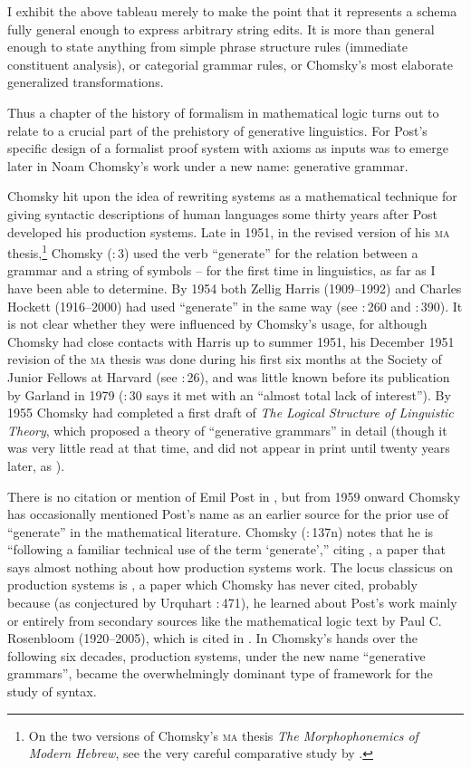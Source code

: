 \documentclass[output=paper]{langscibook}
\begin{document}
I exhibit the above tableau merely to make the point that it represents a schema fully general enough to express arbitrary string edits. It is more than general enough to state anything from simple phrase structure rules (immediate constituent analysis), or categorial grammar rules, or Chomsky's most elaborate generalized transformations.

Thus a chapter of the history of formalism in mathematical logic turns out to relate to a crucial part of the prehistory of generative linguistics. For Post's specific design of a formalist proof system with axioms as inputs was to emerge later in Noam Chomsky's work under a new name: generative grammar.

Chomsky hit upon the idea of rewriting systems as a mathematical technique for giving syntactic descriptions of human languages some thirty years after Post developed his production systems.  Late in 1951, in the revised version of his \textsc{ma} thesis,\footnote{On the two versions of Chomsky's \textsc{ma} thesis \textit{The Morphophonemics of Modern Hebrew}, see the very careful comparative study by \citet{Daniels10}.} Chomsky (\citeyear{Chomsky51b}:\,3) used the verb ``generate'' for the relation between a grammar and a string of symbols -- for the first time in linguistics, as far as I have been able to determine.  By 1954 both Zellig Harris (1909--1992) and Charles Hockett (1916--2000) had used ``generate'' in the same way (see \citealt{Harris54transfer}:\,260 and \citealt{Hockett54}:\,390). It is not clear whether they were influenced by Chomsky's usage, for although Chomsky had close contacts with Harris up to summer 1951, his December 1951 revision of the \textsc{ma} thesis was done during his first six months at the Society of Junior Fellows at Harvard (see \citealt{Chomsky75LSLT}:\,26), and was little known before its publication by Garland in 1979 (\citealt{Chomsky75LSLT}:\,30 says it met with an ``almost total lack of interest''). By 1955 \nocite{Chomsky55LSLT} Chomsky had completed a first draft of \textit{The Logical Structure of Linguistic Theory}, which proposed a theory of ``generative grammars'' in detail (though it was very little read at that time, and did not appear in print until twenty years later, as \citealt{Chomsky75LSLT}).

There is no citation or mention of Emil Post in \citet{Chomsky55LSLT}, but from 1959 onward Chomsky has occasionally mentioned Post's name as an earlier source for the prior use of ``generate'' in the mathematical literature. Chomsky (\citeyear{Chomsky59CFPG}:\,137n) notes that he is ``following a familiar technical use of the term `generate','' citing \citet{Post44}, a paper that says almost nothing about how production systems work. The locus classicus on production systems is \citet{Post43}, a paper which Chomsky has never cited, probably because (as conjectured by Urquhart \citeyear{Urquhart09}:\,471), he learned about Post's work mainly or entirely from secondary sources like the \citeyear{Rosenbloom50} mathematical logic text by Paul C. Rosenbloom (1920--2005), which is cited in \citet{Chomsky75LSLT}. In Chomsky's hands over the following six decades, production systems, under the new name ``generative grammars'', became the overwhelmingly dominant type of framework for the study of syntax.
\end{document}
